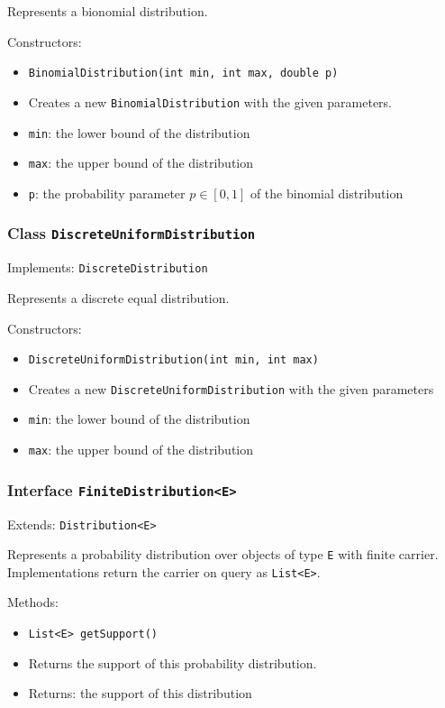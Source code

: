 \documentclass[parskip=full,11pt]{scrartcl}
\begin{document}
Represents a bionomial distribution.

Constructors:
\begin{itemize}\itemsep -10pt
\item \texttt{BinomialDistribution(int min, int max, double p)}
\item[] Creates a new \texttt{BinomialDistribution} with the given parameters.
\item[] \texttt{min}: the lower bound of the distribution
\item[] \texttt{max}: the upper bound of the distribution
\item[] \texttt{p}: the probability parameter \(p \in [0,1]\) of the binomial distribution
\end{itemize}

\subsubsection{Class \texttt{DiscreteUniformDistribution}}
Implements: \texttt{DiscreteDistribution}

Represents a discrete equal distribution.

Constructors:
\begin{itemize}\itemsep -10pt
\item \texttt{DiscreteUniformDistribution(int min, int max)}
\item[] Creates a new \texttt{DiscreteUniformDistribution} with the given parameters
\item[] \texttt{min}: the lower bound of the distribution
\item[] \texttt{max}: the upper bound of the distribution
\end{itemize}

\subsubsection{Interface \texttt{FiniteDistribution<E>}}

Extends: \texttt{Distribution<E>}

Represents a probability distribution over objects of type \texttt{E} with finite carrier. Implementations return the carrier on query as \texttt{List<E>}.

Methods:
\begin{itemize}\itemsep -10pt
\item \texttt{List<E> getSupport()}
\item[] Returns the support of this probability distribution.
\item[] Returns: the support of this distribution
\end{itemize}
\end{document}
